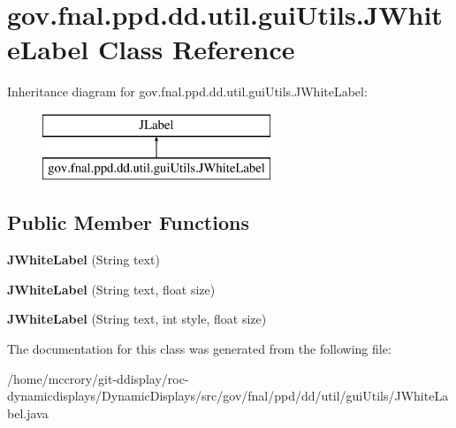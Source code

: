 \hypertarget{classgov_1_1fnal_1_1ppd_1_1dd_1_1util_1_1guiUtils_1_1JWhiteLabel}{\section{gov.\-fnal.\-ppd.\-dd.\-util.\-gui\-Utils.\-J\-White\-Label Class Reference}
\label{classgov_1_1fnal_1_1ppd_1_1dd_1_1util_1_1guiUtils_1_1JWhiteLabel}
}
Inheritance diagram for gov.\-fnal.\-ppd.\-dd.\-util.\-gui\-Utils.\-J\-White\-Label\-:\begin{figure}[H]
\begin{center}
\leavevmode
\includegraphics[height=2.000000cm]{classgov_1_1fnal_1_1ppd_1_1dd_1_1util_1_1guiUtils_1_1JWhiteLabel}
\end{center}
\end{figure}
\subsection*{Public Member Functions}
\begin{DoxyCompactItemize}
\item 
\hypertarget{classgov_1_1fnal_1_1ppd_1_1dd_1_1util_1_1guiUtils_1_1JWhiteLabel_aba0b416af91c261f39ba3a495a04c7cc}{{\bfseries J\-White\-Label} (String text)}\label{classgov_1_1fnal_1_1ppd_1_1dd_1_1util_1_1guiUtils_1_1JWhiteLabel_aba0b416af91c261f39ba3a495a04c7cc}

\item 
\hypertarget{classgov_1_1fnal_1_1ppd_1_1dd_1_1util_1_1guiUtils_1_1JWhiteLabel_a06b0ad34fb1e885990a358d562ed2daa}{{\bfseries J\-White\-Label} (String text, float size)}\label{classgov_1_1fnal_1_1ppd_1_1dd_1_1util_1_1guiUtils_1_1JWhiteLabel_a06b0ad34fb1e885990a358d562ed2daa}

\item 
\hypertarget{classgov_1_1fnal_1_1ppd_1_1dd_1_1util_1_1guiUtils_1_1JWhiteLabel_a7c4319d123b76e2da1c282bac6b2bafb}{{\bfseries J\-White\-Label} (String text, int style, float size)}\label{classgov_1_1fnal_1_1ppd_1_1dd_1_1util_1_1guiUtils_1_1JWhiteLabel_a7c4319d123b76e2da1c282bac6b2bafb}

\end{DoxyCompactItemize}


The documentation for this class was generated from the following file\-:\begin{DoxyCompactItemize}
\item 
/home/mccrory/git-\/ddisplay/roc-\/dynamicdisplays/\-Dynamic\-Displays/src/gov/fnal/ppd/dd/util/gui\-Utils/J\-White\-Label.\-java\end{DoxyCompactItemize}
